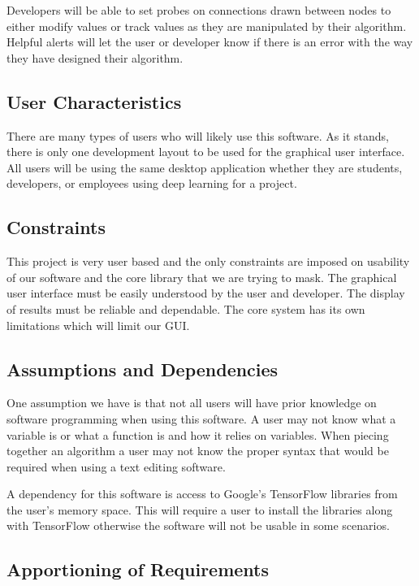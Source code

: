 \documentclass[a4paper,10pt]{article} \usepackage[margin=1.0in]{geometry} \usepackage{pdfpages} \usepackage{graphicx}
\begin{document}
Developers will be able to set probes on connections drawn between nodes to either modify values or track values as they are manipulated by their algorithm.
Helpful alerts will let the user or developer know if there is an error with the way they have designed their algorithm.

\subsection{User Characteristics}

There are many types of users who will likely use this software. 
As it stands, there is only one development layout to be used for the graphical user interface.
All users will be using the same desktop application whether they are students, developers, or employees using deep learning for a project.

\subsection{Constraints}

This project is very user based and the only constraints are imposed on usability of our software and the core library that we are trying to mask.
The graphical user interface must be easily understood by the user and developer.
The display of results must be reliable and dependable.
The core system has its own limitations which will limit our GUI.

\subsection{Assumptions and Dependencies}

One assumption we have is that not all users will have prior knowledge on software programming when using this software.
A user may not know what a variable is or what a function is and how it relies on variables. 
When piecing together an algorithm a user may not know the proper syntax that would be required when using a text editing software.

A dependency for this software is access to Google's TensorFlow libraries from the user's memory space. 
This will require a user to install the libraries along with TensorFlow otherwise the software will not be usable in some scenarios.

\subsection{Apportioning of Requirements}
\end{document}
